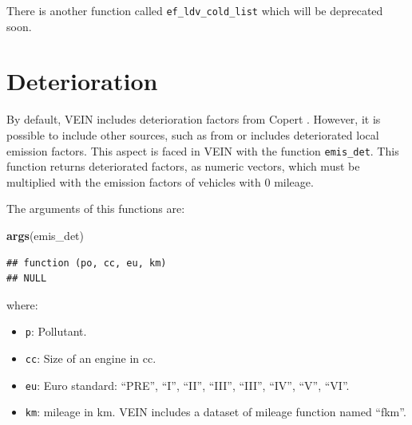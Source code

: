\documentclass[12pt,graybox,envcountchap,sectrefs]{krantz}
\makeatletter
\newenvironment{Shaded}{\begin{snugshade}}{\end{snugshade}}
\newcommand{\KeywordTok}[1]{\textcolor[rgb]{0.13,0.29,0.53}{\textbf{#1}}}
\newcommand{\NormalTok}[1]{#1}
\providecommand{\tightlist}{%
  \setlength{\itemsep}{0pt}\setlength{\parskip}{0pt}}
\newenvironment{kframe}{%
\medskip{}
\setlength{\fboxsep}{.8em}
 \def\at@end@of@kframe{}%
 \ifinner\ifhmode%
  \def\at@end@of@kframe{\end{minipage}}%
  \begin{minipage}{\columnwidth}%
 \fi\fi%
 \def\FrameCommand##1{\hskip\@totalleftmargin \hskip-\fboxsep
 \colorbox{shadecolor}{##1}\hskip-\fboxsep
     \hskip-\linewidth \hskip-\@totalleftmargin \hskip\columnwidth}%
 \MakeFramed {\advance\hsize-\width
   \@totalleftmargin\z@ \linewidth\hsize
   \@setminipage}}%
 {\par\unskip\endMakeFramed%
 \at@end@of@kframe}
\renewenvironment{Shaded}{\begin{kframe}}{\end{kframe}}
\theoremstyle{definition}
\theoremstyle{definition}
\theoremstyle{definition}
\theoremstyle{remark}
\makeatother
\begin{document}
There is another function called \texttt{ef\_ldv\_cold\_list} which will
be deprecated soon.

\section{Deterioration}\label{det}

By default, VEIN includes deterioration factors from Copert
\citep{NtziachristosSamaras2016}. However, it is possible to include
other sources, such as from \citep{CorvalanVargas2003} or includes
deteriorated local emission factors. This aspect is faced in VEIN with
the function \texttt{emis\_det}. This function returns deteriorated
factors, as numeric vectors, which must be multiplied with the emission
factors of vehicles with 0 mileage.

The arguments of this functions are:

\begin{Shaded}
\begin{Highlighting}[]
\KeywordTok{args}\NormalTok{(emis_det)}
\end{Highlighting}
\end{Shaded}

\begin{verbatim}
## function (po, cc, eu, km) 
## NULL
\end{verbatim}

where:

\begin{itemize}
\tightlist
\item
  \texttt{p}: Pollutant.
\item
  \texttt{cc}: Size of an engine in cc.
\item
  \texttt{eu}: Euro standard: ``PRE'', ``I'', ``II'', ``III'', ``III'',
  ``IV'', ``V'', ``VI''.
\item
  \texttt{km}: mileage in km. VEIN includes a dataset of mileage
  function named ``fkm''.
\end{itemize}
\end{document}
